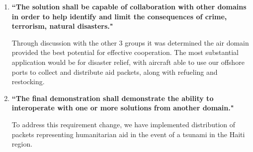 \begin{enumerate}[label={\textbf{(\arabic*)}}, itemsep=3pt, topsep=4pt]
\item \textbf{``The solution shall be capable of collaboration with other domains in order to help identify and limit the consequences of crime, terrorism, natural disasters."}

	Through discussion with the other 3 groups it was determined the air domain provided the best potential for effective cooperation. The most substantial application would be for disaster relief, with aircraft able to use our offshore ports to collect and distribute aid packets, along with refueling and restocking.

\item \textbf{``The final demonstration shall demonstrate the ability to interoperate with one or more solutions from another domain."}

	To address this requirement change, we have implemented distribution of packets representing humanitarian aid in the event of a tsunami in the Haiti region.

\end{enumerate}
